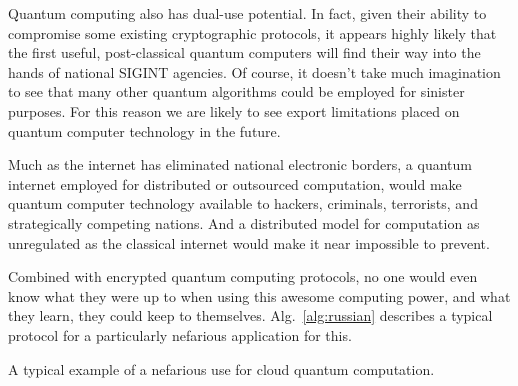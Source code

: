 \documentclass[aps, rmp, twocolumn, amsmath, amssymb, nofootinbib, superscriptaddress, longbibliography, floatfix, table-of-contents, eqsecnum]{revtex4-1}
\begin{document}
Quantum computing also has dual-use potential. In fact, given their ability to compromise some existing cryptographic protocols, it appears highly likely that the first useful, post-classical quantum computers will find their way into the hands of national SIGINT agencies. Of course, it doesn't take much imagination to see that many other quantum algorithms could be employed for sinister purposes. For this reason we are likely to see export limitations placed on quantum computer technology in the future.

Much as the internet has eliminated national electronic borders, a quantum internet employed for distributed or outsourced computation, would make quantum computer technology available to hackers, criminals, terrorists, and strategically competing nations. And a distributed model for computation as unregulated as the classical internet would make it near impossible to prevent.

Combined with encrypted quantum computing protocols, no one would even know what they were up to when using this awesome computing power, and what they learn, they could keep to themselves. Alg.~\ref{alg:russian} describes a typical protocol for a particularly nefarious application for this.

\begin{table}[!htb]
\caption{A typical example of a nefarious use for cloud quantum computation.} \label{alg:russian}
\end{table}
\end{document}
